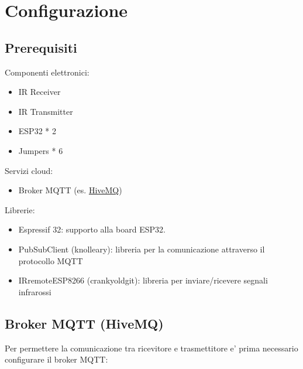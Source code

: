 \documentclass[a4paper,11pt]{article}
\begin{document}
\section{Configurazione}

    \subsection{Prerequisiti}

    Componenti elettronici:
    \begin{itemize}
      \item IR Receiver
      \item IR Transmitter
      \item ESP32 * 2
      \item Jumpers * 6
    \end{itemize}

    \noindent
    Servizi cloud:
    \begin{itemize}
      \item Broker MQTT (es. \href{https://www.hivemq.com/}{HiveMQ})
    \end{itemize}

    \noindent
    Librerie:
    \begin{itemize}
        \item Espressif 32: supporto alla board ESP32.
        \item PubSubClient (knolleary): libreria per la comunicazione attraverso il protocollo MQTT
        \item IRremoteESP8266 (crankyoldgit): libreria per inviare/ricevere segnali infrarossi
    \end{itemize}

    \subsection{Broker MQTT (HiveMQ)}
    \label{subsec:Broker}

    Per permettere la comunicazione tra ricevitore e trasmettitore e' prima necessario configurare il broker MQTT:
\end{document}
